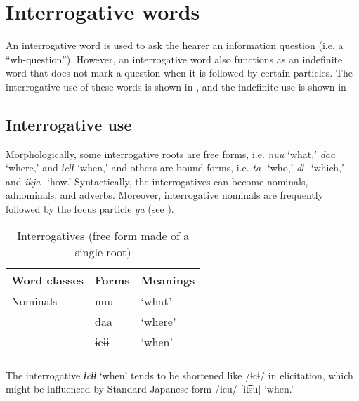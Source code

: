 \section{Interrogative words}
\label{sec:key:5.3}
An interrogative word is used to ask the hearer an information question (i.e. a “wh-question”). However, an interrogative word also functions as an indefinite word that does not mark a question when it is followed by certain particles. The interrogative use of these words is shown in , and the indefinite use is shown in 

\subsection{Interrogative use}

Morphologically, some interrogative roots are free forms, i.e. \textit{nuu} ‘what,’ \textit{daa} ‘where,’ and \textit{ɨcɨɨ} ‘when,’ and others are bound forms, i.e. \textit{ta-} ‘who,’ \textit{dɨ-} ‘which,’ and \textit{ikja-} ‘how.’ Syntactically, the interrogatives can become nominals, adnominals, and adverbs. Moreover, interrogative nominals are frequently followed by the focus particle \textit{ga} (see ).

\begin{table}
\caption{\label{tab:key:38}Interrogatives (free form made of a single root)}
\begin{tabular}{lll}
Word classes  &  Forms & Meanings\\\midrule
Nominals  &  nuu  & ‘what’\\
          &  daa  & ‘where’\\
          &  ɨcɨɨ & ‘when’\\
\lspbottomrule
\end{tabular}
\end{table}

The interrogative \textit{ɨcɨɨ} ‘when’ tends to be shortened like /ɨcɨ/ in elicitation, which might be influenced by Standard Japanese form /icu/ [it͡su] ‘when.’

